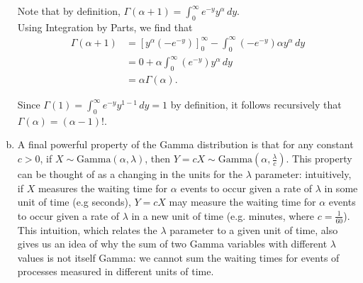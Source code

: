 \begin{enumerate}[a)]
    Note that by definition, $\Gamma(\alpha + 1) = \int_0^{\infty} e^{-y} y^{\alpha} \, dy$. \\

    Using Integration by Parts, we find that
    \begin{align*}
        \Gamma(\alpha + 1) &= \left[ y^\alpha (-e^{-y}) \right]_0^{\infty} - \int_0^{\infty} (-e^{-y}) \alpha y^\alpha \, dy \\
        &= 0 + \alpha \int_0^{\infty} (e^{-y}) y^\alpha \, dy \\
        &= \alpha \Gamma(\alpha).
    \end{align*}

    Since $\Gamma(1) = \int_0^{\infty} e^{-y} y^{1 - 1} \, dy = 1$ by definition, it follows recursively that $\Gamma(\alpha) = (\alpha - 1)!$.

    \item A final powerful property of the Gamma distribution is that for any constant $c > 0$, if $X \sim \mathrm{Gamma}(\alpha, \lambda)$, then
    $Y = cX \sim \mathrm{Gamma}\left(\alpha, \frac{\lambda}{c}\right)$. This property can be thought of as a changing in the units for the $\lambda$ parameter:
    intuitively, if $X$ measures the waiting time for $\alpha$ events to occur given a rate of $\lambda$ in some unit of time (e.g seconds), $Y=cX$ 
    may measure the waiting time for $\alpha$ events to occur given a rate of $\lambda$ in a new unit of time (e.g. minutes, where $c = \frac{1}{60}$). \\

    This intuition, which relates the $\lambda$ parameter to a given unit of time, also gives us an idea of why
    the sum of two Gamma variables with different $\lambda$ values is not itself Gamma: we cannot sum the waiting times for events of
    processes measured in different units of time. \\




\end{enumerate}
